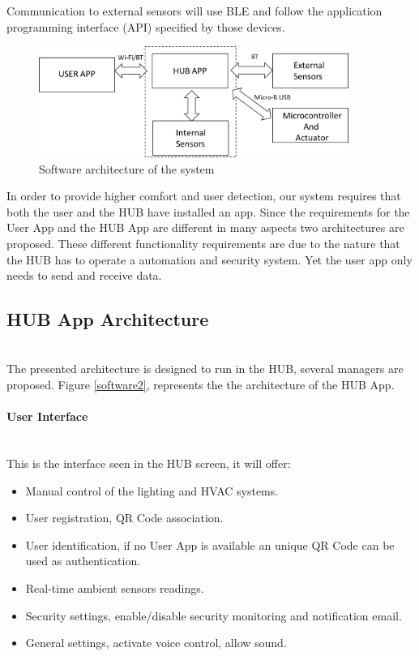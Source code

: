 Communication to external sensors will use BLE and follow the application programming interface (API) specified by those devices.






\begin{figure}[h]
\centering
\includegraphics[width=0.9\textwidth]{Figures/software1}
\caption{Software architecture of the system}
\label{software1}
\end{figure}


In order to provide higher comfort and user detection, our system requires that both the user and the HUB have installed an app. Since the requirements for the User App and the HUB App are different in many aspects two architectures are proposed. These different functionality requirements are due to the nature that the HUB has to operate a automation and security system. Yet the user app only needs to send and receive data.
\subsection{HUB App Architecture}\mbox{}\\

The presented architecture is designed to run in the HUB, several managers are proposed. Figure \ref{software2}, represents the the architecture of the HUB App.

\paragraph{User Interface}\mbox{}\\
This is the interface seen in the HUB screen, it will offer:

\begin{itemize}
  \item Manual control of the lighting and HVAC systems.
  \item User registration, QR Code association.
  \item User identification, if no User App is available an unique QR Code can be used as authentication.
  \item Real-time ambient sensors readings.
  \item Security settings, enable/disable security monitoring and notification email.
  \item General settings, activate voice control, allow sound.
   
\end{itemize}

